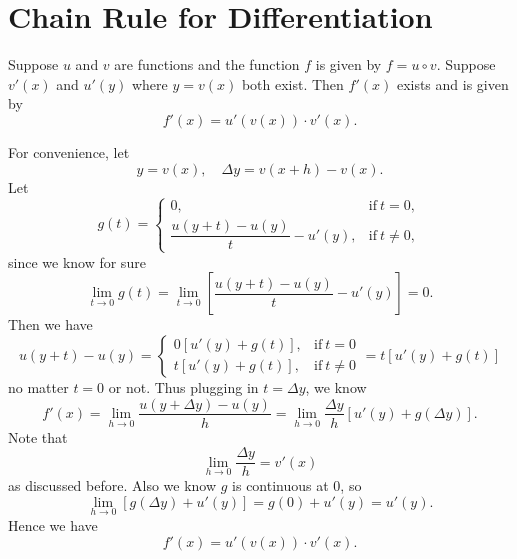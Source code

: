 	\section{Chain Rule for Differentiation}
	\begin{theoremenv}
		Suppose $u$ and $v$ are functions and the function $f$ is given by
		$f=u\circ v$. Suppose $v'(x)$ and $u'(y)$ where $y=v(x)$ both exist. Then $f'(x)$ exists and is given by
		\[
		f'(x) = u'(v(x)) \cdot v'(x).
		\]
	\end{theoremenv}
	\begin{proofenv}
		For convenience, let
		\[
		y=v(x),\quad \Delta y = v(x+h) - v(x).
		\]
		Let
		\[
		g(t)= 
		\begin{cases}
		0, & \text{if}\ t=0,\\[6pt]
		\dfrac{u(y+t) - u(y)}{t}-u'(y), & \text{if}\ t\neq 0,
		\end{cases}
		\]
		since we know for sure
		\[
		\lim_{t\to 0} g(t) = \lim_{t\to 0} \left[ \frac{u(y+t) - u(y)}{t} - u'(y) \right]=0.
		\]
		Then we have
		\[
		u(y+t)-u(y)=
		\begin{cases}
		0\left[u'(y) + g(t)\right], & \text{if}\ t=0\\[6pt]
		t\left[u'(y) + g(t)\right], & \text{if}\ t\neq 0
		\end{cases}
		= t\left[u'(y) + g(t)\right]
		\]
		no matter $t=0$ or not. Thus plugging in $t=\Delta y$, we know
		\[
		f'(x)=\lim_{h\to 0} \frac{u(y + \Delta y) - u(y)}{h} = \lim_{h\to 0} \frac{\Delta y}{h} \left[u'(y) + g(\Delta y)\right].
		\]
		Note that
		\[
		\lim_{h\to 0} \frac{\Delta y}{h}=v'(x)
		\]
		as discussed before. Also we know $g$ is continuous at $0$, so
		\[
		\lim_{h\to 0} \left[g(\Delta y)+ u'(y)\right] = g(0) + u'(y) = u'(y).
		\]
		Hence we have
		\[
		f'(x) = u'(v(x)) \cdot v'(x).
		\]
	\end{proofenv}
